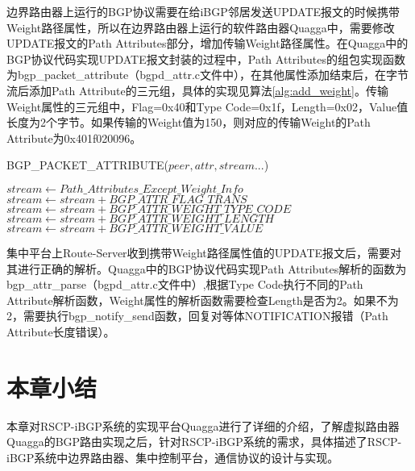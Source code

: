 边界路由器上运行的BGP协议需要在给iBGP邻居发送UPDATE报文的时候携带Weight路径属性，所以在边界路由器上运行的软件路由器Quagga中，需要修改UPDATE报文的Path Attributes部分，增加传输Weight路径属性。在Quagga中的BGP协议代码实现UPDATE报文封装的过程中，Path Attributes的组包实现函数为bgp\_packet\_attribute（bgpd\_attr.c文件中），在其他属性添加结束后，在字节流后添加Path Attribute的三元组，具体的实现见算法\ref{alg:add_weight}。传输Weight属性的三元组中，Flag=0x40和Type Code=0x1f，Length=0x02，Value值长度为2个字节。如果传输的Weight值为150，则对应的传输Weight的Path  Attribute为0x401f020096。

\begin{algorithm}[!h]
    \caption{BGP\_PACKET\_ATTRIBUTE($peer,attr,stream...$)}%
    \label{alg:add_weight}
    \begin{algorithmic}[1]%
        \STATE $stream \gets Path\_Attributes\_Except\_Weight\_Info$
        \STATE $stream \gets stream+BGP\_ATTR\_FLAG\_TRANS$
        \STATE $stream \gets stream+BGP\_ATTR\_WEIGHT\_TYPE\_CODE$
        \STATE $stream \gets stream+BGP\_ATTR\_WEIGHT\_LENGTH$
        \STATE $stream \gets stream+BGP\_ATTR\_WEIGHT\_VALUE$
        \ENDIF
    \end{algorithmic}
\end{algorithm}


集中平台上Route-Server收到携带Weight路径属性值的UPDATE报文后，需要对其进行正确的解析。Quagga中的BGP协议代码实现Path Attributes解析的函数为bgp\_attr\_parse（bgpd\_attr.c文件中）,根据Type Code执行不同的Path Attribute解析函数，Weight属性的解析函数需要检查Length是否为2。如果不为2，需要执行bgp\_notify\_send函数，回复对等体NOTIFICATION报错（Path Attribute长度错误）。



\section{本章小结}
本章对RSCP-iBGP系统的实现平台Quagga进行了详细的介绍，了解虚拟路由器Quagga的BGP路由实现之后，针对RSCP-iBGP系统的需求，具体描述了RSCP-iBGP系统中边界路由器、集中控制平台，通信协议的设计与实现。
